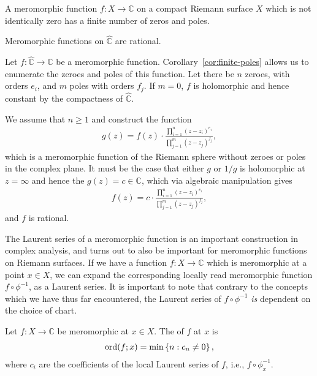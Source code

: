\begin{corollary}\label{cor:finite-poles}
	A meromorphic function $ f:X \to \mathbb{C} $ on a compact Riemann surface $ X $
	which is not identically zero has a finite number of zeros and poles.
\end{corollary}

\begin{example}\label{ex:mero-rational-Ch}
	Meromorphic functions on $ \hat{\mathbb{C}} $ are rational.

	Let $ f:\hat{\mathbb{C}} \to \mathbb{C} $ be a meromorphic function.
	Corollary~\ref{cor:finite-poles} allows us to enumerate the zeroes and poles of
	this function. Let there be $ n $ zeroes, with orders $ e_{i} $, and $ m $
	poles with orders $ f_{j} $. If $ m=0 $, $ f $ is holomorphic and hence
	constant by the compactness of $ \hat{\mathbb{C}} $.

	We assume that $ n\geq 1 $ and construct the function
	\begin{align*}
		g(z) = f(z)\cdot \frac{\prod_{i=1}^{n}{(z-z_i)
		^{e_i}}}{\prod_{j=1}^{m}{(z-z_j)^{f_j}}},
	\end{align*}
	which is a meromorphic function of the Riemann sphere without zeroes or poles in
	the complex plane. It must be the case that either $ g $ or $ 1/g $ is
	holomorphic at $ z=\infty $ and hence the $ g(z) = c \in \mathbb{C} $, which
	via algebraic manipulation gives
	\begin{align*}
		f(z) = c\cdot \frac{\prod_{i=1}^{n}{(z-z_i)
		^{e_i}}}{\prod_{j=1}^{m}{(z-z_j)^{f_j}}},
	\end{align*}
	and $ f $ is rational.
\end{example}

The Laurent series of a meromorphic function is an important construction in
complex analysis, and turns out to also be important for meromorphic functions
on Riemann surfaces. If we have a function $ f:X \to \mathbb{C} $ which is
meromorphic at a point $ x \in X $, we can expand the corresponding locally read
meromorphic function $ f \circ \phi ^{-1} $, as a Laurent series. It is
important to note that contrary to the concepts which we have thus far
encountered, the Laurent series of $ f \circ \phi ^{-1} $ \textit{is} dependent
on the choice of chart.

\begin{definition}[Order]
	Let $ f:X \to \mathbb{C} $ be meromorphic at $ x \in X $. The 
	of $ f $ at $ x $ is
	\begin{align*}
		\operatorname{ord}(f;x) = \min \left\{ n : c_n \neq 0 \right\},
	\end{align*}
	where $ c_i $ are the coefficients of the local Laurent series of $ f $, i.e.,
	$ f \circ \phi_{x}^{-1} $.
\end{definition}

